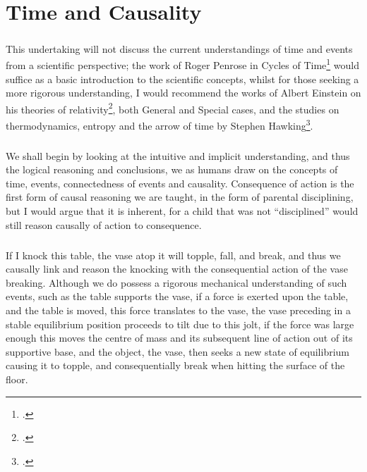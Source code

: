 \chapter{Time and Causality}\label{chapter:timeandcausality}

\paragraph{}This undertaking will not discuss the current understandings of time and events from a scientific perspective; the work of Roger Penrose in Cycles of Time\footcite[]{penrose2011cycles} would suffice as a basic introduction to the scientific concepts, whilst for those seeking a more rigorous understanding, I would recommend the works of Albert Einstein on his theories of relativity\footcite[]{einstein2001relativity}, both General and Special cases, and the studies on thermodynamics, entropy and the arrow of time by Stephen Hawking\footcite[]{hawking1988a}.

\paragraph{}We shall begin by looking at the intuitive and implicit understanding, and thus the logical reasoning and conclusions, we as humans draw on the concepts of time, events, connectedness of events and causality. Consequence of action is the first form of causal reasoning we are taught, in the form of parental disciplining, but I would argue that it is inherent, for a child that was not “disciplined” would still reason causally of action to consequence.

\paragraph{}If I knock this table, the vase atop it will topple, fall, and break, and thus we causally link and reason the knocking with the consequential action of the vase breaking. Although we do possess a rigorous mechanical understanding of such events, such as the table supports the vase, if a force is exerted upon the table, and the table is moved, this force translates to the vase, the vase preceding in a stable equilibrium position proceeds to tilt due to this jolt, if the force was large enough this moves the centre of mass and its subsequent line of action out of its supportive base, and the object, the vase, then seeks a new state of equilibrium causing it to topple, and consequentially break when hitting the surface of the floor.

